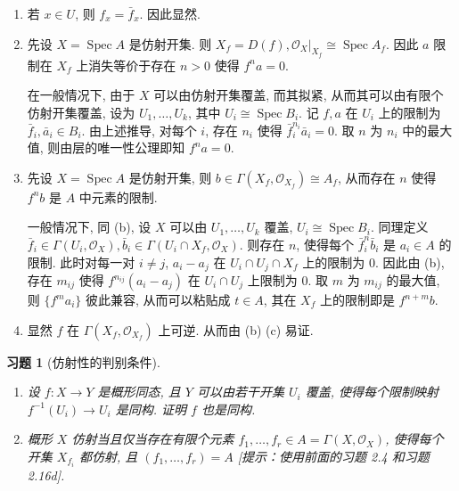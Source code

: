 \documentclass{article}
\theoremstyle{exercise}
\newtheorem{exercise}{习题}[section]
\newenvironment{proofc}{\proof}{\endproof}
\def\sO{\mathscr{O}}
\def\Spec{\operatorname{Spec}}
\begin{document}
\begin{proofc}
  \begin{enumerate}[label={(\alph*)}]
    \item 若 $x \in U$, 则 $f_x = \bar{f}_x$. 因此显然.
    \item 先设 $X = \Spec A$ 是仿射开集. 则 $X_f = D(f), \sO_X|_{X_f} \cong \Spec A_f$.
          因此 $a$ 限制在 $X_f$ 上消失等价于存在 $n > 0$ 使得 $f^n a = 0$.

          在一般情况下, 由于 $X$ 可以由仿射开集覆盖, 而其拟紧, 从而其可以由有限个仿射开集覆盖,
          设为 $U_1, \dots, U_k$, 其中 $U_i \cong \Spec B_i$.
          记 $f, a$ 在 $U_i$ 上的限制为 $\bar{f}_i, \bar{a}_i \in B_i$.
          由上述推导, 对每个 $i$, 存在 $n_i$ 使得 $\bar{f}_i^{n_i} \bar{a}_i = 0$.
          取 $n$ 为 $n_i$ 中的最大值, 则由层的唯一性公理即知 $f^n a = 0$.
    \item 先设 $X = \Spec A$ 是仿射开集, 则 $b \in \Gamma(X_f, \sO_{X_f}) \cong A_f$,
          从而存在 $n$ 使得 $f^n b$ 是 $A$ 中元素的限制.

          一般情况下, 同 (b), 设 $X$ 可以由 $U_1, \dots, U_k$ 覆盖, $U_i \cong \Spec B_i$.
          同理定义 $\bar{f}_i \in \Gamma(U_i, \sO_X), \bar{b}_i \in \Gamma(U_i \cap X_f, \sO_X)$.
          则存在 $n$, 使得每个 $\bar{f}_i^n \bar{b}_i$ 是 $a_i \in A$ 的限制.
          此时对每一对 $i \neq j$, $a_i - a_j$ 在 $U_i \cap U_j \cap X_f$ 上的限制为 $0$.
          因此由 (b), 存在 $m_{ij}$ 使得 $f^{n_{ij}} (a_i - a_j)$ 在 $U_i \cap U_j$ 上限制为 $0$.
          取 $m$ 为 $m_{ij}$ 的最大值, 则 $\{ f^m a_i \}$ 彼此兼容,
          从而可以粘贴成 $t \in A$, 其在 $X_f$ 上的限制即是 $f^{n + m} b$.
    \item 显然 $f$ 在 $\Gamma(X_f, \sO_{X_f})$ 上可逆. 从而由 (b) (c) 易证.
          \qedhere
  \end{enumerate}
\end{proofc}

\begin{exercise}[仿射性的判别条件]
  \begin{enumerate}[label={(\alph*)}]
    \item 设 $f \colon X \to Y$ 是概形同态, 且 $Y$ 可以由若干开集 $U_i$ 覆盖,
          使得每个限制映射 $f^{-1}(U_i) \to U_i$ 是同构. 证明 $f$ 也是同构.
    \item 概形 $X$ 仿射当且仅当存在有限个元素 $f_1, \dots, f_r \in A = \Gamma(X, \sO_X)$,
          使得每个开集 $X_{f_i}$ 都仿射, 且 $(f_1, \dots, f_r) = A$
          [提示：使用前面的习题 2.4 和习题 2.16d].
  \end{enumerate}
\end{exercise}
\end{document}
